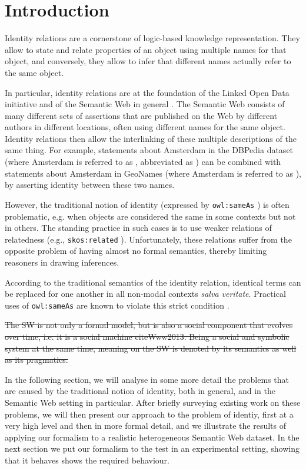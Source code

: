 \section{Introduction}
\label{sec:introduction}

Identity relations are a cornerstone of logic-based knowledge representation.
They allow to state and relate properties of an object using multiple names for that object, 
and conversely, they allow to infer that different names actually refer to the same object. 

In particular, identity relations are at the foundation of the Linked Open Data initiative
  and of the Semantic Web in general \cite{BizerCyganiakHeath2007}.
The Semantic Web consists of many different sets of assertions that are published on 
the Web by different authors in different locations, often using different names for 
the same object. Identity relations then 
allow the interlinking of these multiple descriptions of the same thing.
For example, statements about Amsterdam in the DBPedia dataset   
(where Amsterdam is referred to as 
, abbreviated as
) 
can be combined with statements about Amsterdam in GeoNames
(where Amsterdam is referred to as 
), by asserting identity between 
these two names. 

However, the traditional notion of identity
  (expressed by \texttt{owl:sameAs} \cite{MotikPaterschneiderGrau2012})
  is often problematic, e.g. when objects are considered the same in some
  contexts but not in others.
The standing practice in such cases is to use weaker relations of relatedness
  (e.g., \texttt{skos:related} \cite{MilesBechhofer2009}).
Unfortunately, these relations suffer from the opposite problem of having 
almost no formal semantics, thereby limiting reasoners in drawing inferences.

According to the traditional semantics of the identity relation,
  identical terms can be replaced for one another in all non-modal contexts
  \emph{salva veritate}.
Practical uses of \texttt{owl:sameAs} are known to violate this
  strict condition
  \cite{HalpinHayes2010,HalpinHayesMccuskerMcguinnessThompson2010}.

\sout{The SW is not only a formal model,
  but is also a social component that evolves over time,
  i.e. it is a social machine cite{Www2013}.
Being a social and symbolic system at the same time,
  meaning on the SW is denoted by its semantics as well as its pragmatics.}

In the following section, we will analyse in some more detail the problems that
are caused by the traditional notion of identity, both in general, and in the Semantic Web
setting in particular. After briefly surveying existing work on these problems, 
we will then present our approach to the problem of identiy, 
first at a very high level and then in more formal detail, and we illustrate
the results of applying our formalism to a realistic heterogeneous Semantic Web 
dataset. In the next section we 
put our formalism to the test in an experimental setting,
showing that it behaves shows the required behaviour. 
